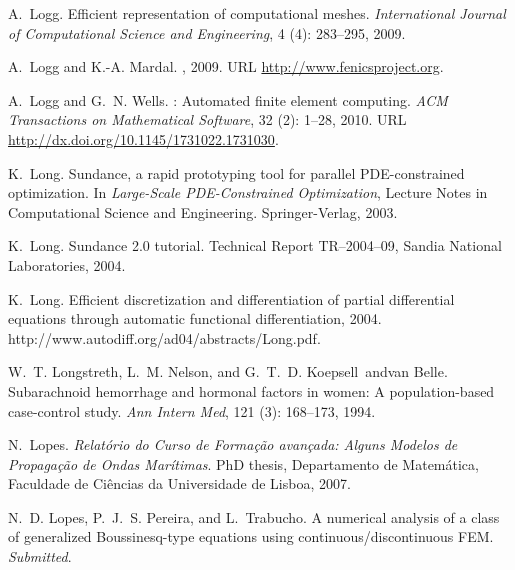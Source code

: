 \begin{thebibliography}{467}
A.~Logg.
\newblock Efficient representation of computational meshes.
\newblock \emph{International Journal of Computational Science and
  Engineering}, 4 (4): 283--295, 2009.

A.~Logg and K.-A. Mardal.
, 2009.
\newblock URL \url{http://www.fenicsproject.org}.

A.~Logg and G.~N. Wells.
: {A}utomated finite element computing.
\newblock \emph{ACM Transactions on Mathematical Software}, 32
  (2): 1--28, 2010.
\newblock URL \url{http://dx.doi.org/10.1145/1731022.1731030}.

K.~Long.
\newblock Sundance, a rapid prototyping tool for parallel {PDE}-constrained
  optimization.
\newblock In \emph{Large-Scale PDE-Constrained Optimization}, Lecture Notes in
  Computational Science and Engineering. Springer-Verlag, 2003.

K.~Long.
\newblock Sundance 2.0 tutorial.
\newblock Technical Report TR--2004--09, Sandia National Laboratories,
  2004{}.

K.~Long.
\newblock Efficient discretization and differentiation of partial differential
  equations through automatic functional differentiation, 2004{}.
\newblock http://www.autodiff.org/ad04/abstracts/Long.pdf.

W.~T. Longstreth, L.~M. Nelson, and G.~T.~D. Koepsell~andvan Belle.
\newblock Subarachnoid hemorrhage and hormonal factors in women: {A}
  population-based case-control study.
\newblock \emph{Ann Intern Med}, 121 (3): 168--173, 1994.

N.~Lopes.
\newblock \emph{{R}elat\'{o}rio do Curso de Forma\c{c}\~{a}o avan\c{c}ada:
  Alguns Modelos de Propaga\c{c}\~{a}o de Ondas Mar\'{i}timas}.
\newblock PhD thesis, Departamento de Matem\'{a}tica, Faculdade de Ci\^{e}ncias
  da Universidade de Lisboa, 2007.

N.~D. Lopes, P.~J.~S. Pereira, and L.~Trabucho.
\newblock A numerical analysis of a class of generalized {B}oussinesq-type
  equations using continuous/discontinuous {FEM}.
\newblock \emph{Submitted}.


\end{thebibliography}
